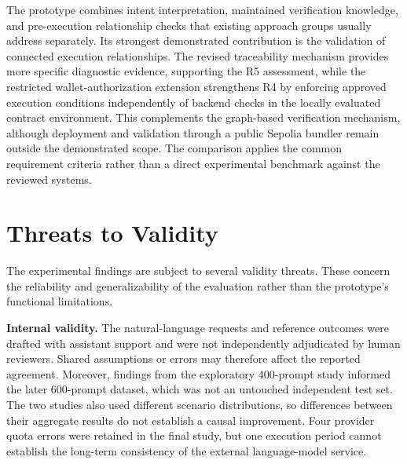 The prototype combines intent interpretation, maintained verification
knowledge, and pre-execution relationship checks that existing approach
groups usually address separately. Its strongest demonstrated contribution
is the validation of connected execution relationships. The revised
traceability mechanism provides more specific diagnostic evidence, supporting
the R5 assessment, while the restricted wallet-authorization extension strengthens R4
by enforcing approved execution conditions independently of
backend checks in the locally evaluated contract environment.
This complements the graph-based verification mechanism,
although deployment and validation through a public Sepolia
bundler remain outside the demonstrated scope. The comparison applies the common requirement criteria rather
than a direct experimental benchmark against the reviewed systems.


\endgroup


\section{Threats to Validity}
\label{sec:evaluation_threats}

The experimental findings are subject to several validity threats. These
concern the reliability and generalizability of the evaluation rather than
the prototype's functional limitations.

\medskip\noindent\textbf{Internal validity.}
The natural-language requests and reference outcomes were drafted with
assistant support and were not independently adjudicated by human reviewers.
Shared assumptions or errors may therefore affect the reported agreement.
Moreover, findings from the exploratory 400-prompt study informed the later
600-prompt dataset, which was not an untouched independent test set. The two
studies also used different scenario distributions, so differences between
their aggregate results do not establish a causal improvement. Four provider
quota errors were retained in the final study, but one execution period cannot
establish the long-term consistency of the external language-model service.

